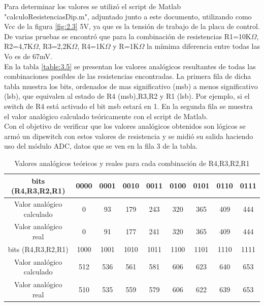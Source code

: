 Para determinar los valores se \textcolor{FIXME}{utilizó el script de Matlab "calculoResistenciasDip.m", adjuntado junto a este documento}, utilizando como Vcc de la figura \ref{fig:2.3} 5V, ya que es la tensión de trabajo de la placa de control. De varias pruebas se encontró que para la combinación de resistencias R1=10K\(\Omega\), R2=4,7K\(\Omega\), R3=2,2K\(\Omega\), R4=1K\(\Omega\) y R=1K\(\Omega\) la mímima diferencia entre todas las Vo es de 67mV.\\
En la tabla \ref{table:3.5} se presentan los valores analógicos resultantes de todas las combinaciones posibles de las resistencias encontradas. La primera fila de dicha tabla muestra los bits, ordenados de mas significativo (msb) a menos significativo (lsb), que equivalen al estado de R4 (msb),R3,R2 y R1 (lsb). Por ejemplo, si el switch de R4 está activado el bit msb estará en 1. En la segunda fila se muestra el valor analógico calculado teóricamente con el script de Matlab.\\
Con el objetivo de verificar que los valores analógicos obtenidos son lógicos se armó un dipswitch con estos valores de resistencia y se midió su salida haciendo uso del módulo ADC, datos que se ven en la fila 3 de la tabla.

\begin{table}[!ht]
	\begin{center}
		\begin{tabular}{|c|c|c|c|c|c|c|c|c|}
			\hline
			\rowcolor{OODlightblue}
			bits (R4,R3,R2,R1) & 0000 & 0001 & 0010 & 0011 & 0100 & 0101 & 0110 & 0111  \\
			\hline
			Valor analógico calculado & 0 & 93 & 179 & 243 & 320 & 365 & 409 & 444 \\
			\hline
			Valor analógico real  & 0 & 91 & 177 & 241 & 320 & 365 & 409 & 444 \\
			\hline \hline
			\rowcolor{OODlightblue}
			bits (R4,R3,R2,R1) & 1000 & 1001 & 1010 & 1011 & 1100 & 1101 & 1110 & 1111  \\
			\hline
			Valor analógico calculado & 512  & 536  & 561  & 581  & 606  & 623  & 640  & 653  \\
			\hline
			Valor analógico real & 510  & 535  & 559  & 579  & 606  & 622  & 639  & 653 \\
			\hline
		\end{tabular}
	\end{center}
	\caption{Valores analógicos teóricos y reales para cada combinación de R4,R3,R2,R1}
	\label{table:\thetable}
\end{table}

